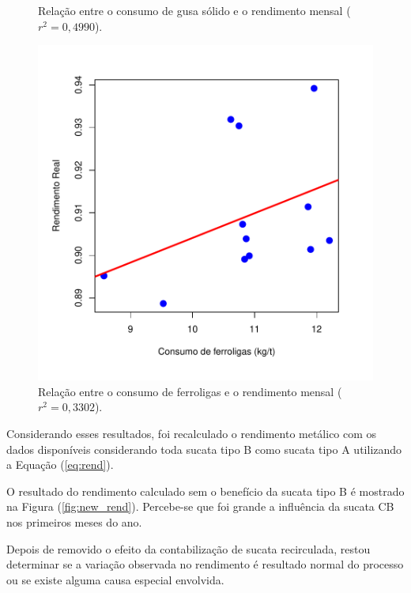 \begin{multicols}{2}
\begin{figure}[H]
		\caption{Relação entre o consumo de gusa sólido e o rendimento mensal ($r^2=0,4990$).}
		\label{fig:sagp}
	\end{figure}
	\begin{figure}[H]
		\centering
		\includegraphics[scale=0.4, bb=0 0 432 432, trim=0in 0in 0in -107pt]{figures/fig10.pdf} %
		\caption{Relação entre o consumo de ferroligas e o rendimento mensal ($r^2=0,3302$).}
		\label{fig:ligas}
	\end{figure}			
\newpage
	Considerando esses resultados, foi recalculado o rendimento metálico com os dados disponíveis\cite{rel4} considerando toda sucata tipo B como sucata tipo A utilizando a Equação (\ref{eq:rend}). 
		
	O resultado do rendimento calculado sem o benefício da sucata tipo B é mostrado na Figura (\ref{fig:new_rend}). Percebe-se que foi grande a influência da sucata CB nos primeiros meses do ano. 

	Depois de removido o efeito da contabilização de sucata recirculada, restou determinar se a variação observada no rendimento é resultado normal do processo ou se existe alguma causa especial envolvida. 
	

\end{multicols}
